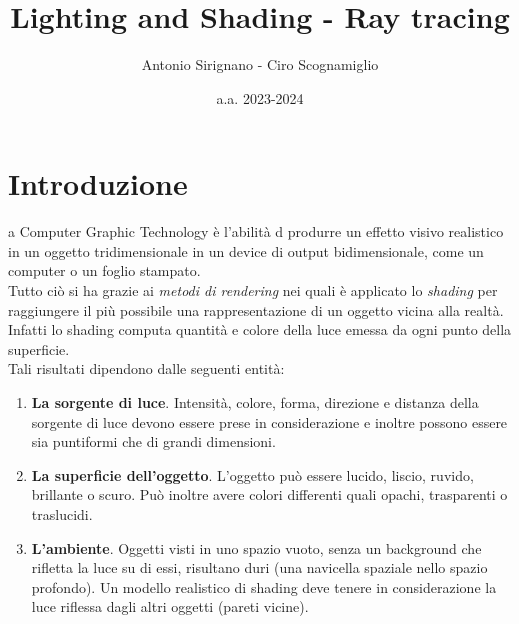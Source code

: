 \documentclass[9pt,a4paper,twoside]{tau}
\title{Lighting and Shading - Ray tracing}
\author{Antonio Sirignano - Ciro Scognamiglio}
\date{a.a. 2023-2024}
\begin{document}
		
	\maketitle
	\thispagestyle{firststyle}
	\tauabstract
	\tableofcontents


\section{Introduzione}

    a Computer Graphic Technology è l'abilità d produrre un effetto visivo realistico in un oggetto tridimensionale in un device di output bidimensionale, come un computer o un foglio stampato.\\
    Tutto ciò si ha grazie ai \textit{metodi di rendering} nei quali è applicato lo \textit{shading} per raggiungere il più possibile una rappresentazione di un oggetto vicina alla realtà.\\ 
    Infatti lo shading computa quantità e colore della luce emessa da ogni punto della superficie.\\
    Tali risultati dipendono dalle seguenti entità:
    \begin{enumerate}
    	\item \textbf{La sorgente di luce}. Intensità, colore, forma, direzione e distanza della sorgente di luce devono essere prese in considerazione e inoltre possono essere sia puntiformi che di grandi dimensioni.
    	\item \textbf{La superficie dell'oggetto}. L'oggetto può essere lucido, liscio, ruvido, brillante o scuro. Può inoltre avere colori differenti quali opachi, trasparenti o traslucidi. 
    	\item \textbf{L'ambiente}. Oggetti visti in uno spazio vuoto, senza un background che rifletta la luce su di essi, risultano duri (una navicella spaziale nello spazio profondo). Un modello realistico di shading deve tenere in considerazione la luce riflessa dagli altri oggetti (pareti vicine).
    \end{enumerate}
\end{document}

